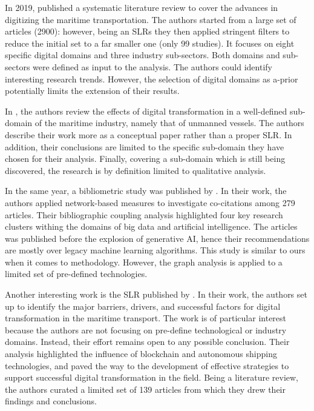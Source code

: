 \documentclass[a4paper, review, endfloat, authoryear]{elsarticle}
\begin{document}
	In 2019, \citep{sanchez2019toward} published a systematic literature review to cover the advances in digitizing the maritime transportation. The authors started from a large set of articles (2900): however, being an SLRs they then applied stringent filters to reduce the initial set to a far smaller one (only 99 studies). It focuses on eight specific digital domains and three industry sub-sectors. Both domains and sub-sectors were defined as input to the analysis. The authors could identify interesting research trends. However, the selection of digital domains as a-prior potentially limits the extension of their results.
	
	In \citep{poulis2020value}, the authors review the effects of digital transformation in a well-defined sub-domain of the maritime industry, namely that of unmanned vessels. The authors describe their work more as a conceptual paper rather than a proper SLR. In addition, their conclusions are limited to the specific sub-domain they have chosen for their analysis. Finally, covering a sub-domain which is still being discovered, the research is by definition limited to qualitative analysis.
	
	In the same year, a bibliometric study was published by \citep{munim2020big}. In their work, the authors applied network-based measures to investigate co-citations among 279 articles. Their bibliographic coupling analysis highlighted four key research clusters withing the domains of big data and artificial intelligence. The articles was published before the explosion of generative AI, hence their recommendations are mostly over legacy machine learning algorithms. This study is similar to ours when it comes to methodology. However, the graph analysis is applied to a limited set of pre-defined technologies.
	
	Another interesting work is the SLR published by \citep{tijan2021digital}. In their work, the authors set up to identify the major barriers, drivers, and successful factors for digital transformation in the maritime transport. The work is of particular interest because the authors are not focusing on pre-define technological or industry domains. Instead, their effort remains open to any possible conclusion. Their analysis highlighted the influence of blockchain and autonomous shipping technologies, and paved the way to the development of effective strategies to support successful digital transformation in the field. Being a literature review, the authors curated a limited set of 139 articles from which they drew their findings and conclusions.
	
\end{document}
